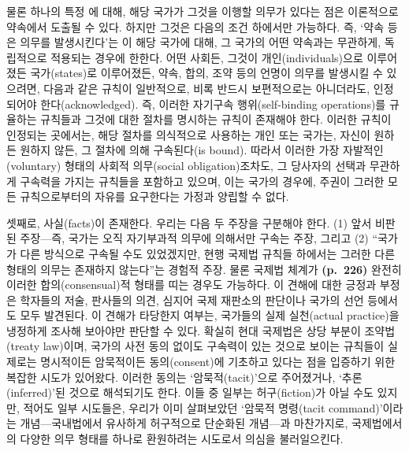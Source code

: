 물론 하나의 특정 에 대해, 해당 국가가 그것을 이행할
의무가 있다는 점은 이론적으로 약속에서 도출될 수 있다. 하지만 그것은
다음의 조건 하에서만 가능하다. 즉, `약속 등은 의무를 발생시킨다'는
이 해당 국가에 대해, 그 국가의 어떤 약속과는 무관하게,
독립적으로 적용되는 경우에 한한다. 어떤 사회든, 그것이
개인(individuals)으로 이루어졌든 국가(states)로 이루어졌든, 약속, 합의,
조약 등의 언명이 의무를 발생시킬 수 있으려면, 다음과 같은 규칙이
일반적으로, 비록 반드시 보편적으로는 아니더라도, 인정되어야
한다(acknowledged). 즉, 이러한 자기구속 행위(self-binding operations)를
규율하는 규칙들과 그것에 대한 절차를 명시하는 규칙이 존재해야 한다.
이러한 규칙이 인정되는 곳에서는, 해당 절차를 의식적으로 사용하는 개인
또는 국가는, 자신이 원하든 원하지 않든, 그 절차에 의해 구속된다(is
bound). 따라서 이러한 가장 자발적인(voluntary) 형태의 사회적 의무(social
obligation)조차도, 그 당사자의 선택과 무관하게 구속력을 가지는 규칙들을
포함하고 있으며, 이는 국가의 경우에, 주권이 그러한 모든 규칙으로부터의
자유를 요구한다는 가정과 양립할 수 없다.

셋째로, 사실(facts)이 존재한다. 우리는 다음 두 주장을 구분해야 한다. (1)
앞서 비판된  주장---즉, 국가는 오직 자기부과적
의무에 의해서만 구속는 주장, 그리고 (2) ``국가가
다른 방식으로 구속될 수도 있었겠지만, 현행 국제법 규칙들 하에서는 그러한
다른 형태의 의무는 존재하지 않는다''는 경험적 주장. 물론 국제법 체계가
\textbf{(p.~226)} 완전히 이러한 합의(consensual)적 형태를 띠는 경우도
가능하다. 이 견해에 대한 긍정과 부정은 학자들의 저술, 판사들의 의견,
심지어 국제 재판소의 판단이나 국가의 선언 등에서도 모두 발견된다. 이
견해가 타당한지 여부는, 국가들의 실제 실천(actual practice)을 냉정하게
조사해 보아야만 판단할 수 있다. 확실히 현대 국제법은 상당 부분이
조약법(treaty law)이며, 국가의 사전 동의 없이도 구속력이 있는 것으로
보이는 규칙들이 실제로는 명시적이든 암묵적이든 동의(consent)에 기초하고
있다는 점을 입증하기 위한 복잡한 시도가 있어왔다. 이러한 동의는
`암묵적(tacit)'으로 주어졌거나, `추론(inferred)'된 것으로 해석되기도
한다. 이들 중 일부는 허구(fiction)가 아닐 수도 있지만, 적어도 일부
시도들은, 우리가 이미 살펴보았던 `암묵적 명령(tacit command)'이라는
개념---국내법에서 유사하게 허구적으로 단순화된 개념---과 마찬가지로,
국제법에서의 다양한 의무 형태를 하나로 환원하려는 시도로서 의심을
불러일으킨다.

